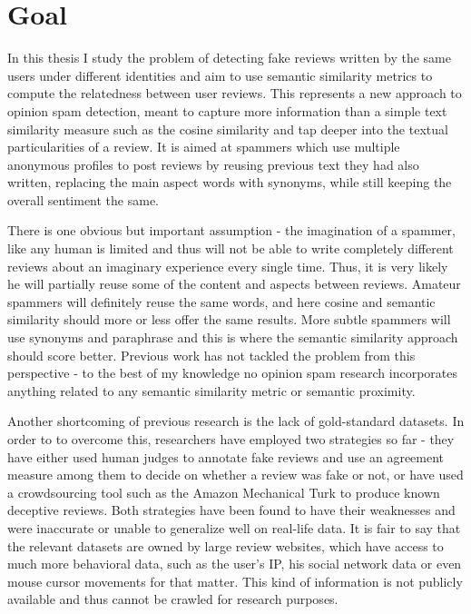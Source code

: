 \chapter{Goal}\label{chapter:goal}

In this thesis I study the problem of detecting fake reviews written by the same users under different identities and aim to use semantic similarity metrics to compute the relatedness between user reviews. This represents a new approach to opinion spam detection, meant to capture more information than a simple text similarity measure such as the cosine similarity and tap deeper into the textual particularities of a review. It is aimed at spammers which use multiple anonymous profiles to post reviews by reusing previous text they had also written, replacing the main aspect words with synonyms, while still keeping the overall sentiment the same. 

There is one obvious but important assumption - the imagination of a spammer, like any human is limited and thus will not be able to write completely different reviews about an imaginary experience every single time. Thus, it is very likely he will partially reuse some of the content and aspects between reviews. Amateur spammers will definitely reuse the same words, and here cosine and semantic similarity should more or less offer the same results. More subtle spammers will use synonyms and paraphrase and this is where the semantic similarity approach should score better. Previous work has not tackled the problem from this perspective - to the best of my knowledge no opinion spam research incorporates anything related to any semantic similarity metric or semantic proximity. 

Another shortcoming of previous research is the lack of gold-standard datasets. In order to to overcome this, researchers have employed two strategies so far - they have either used human judges to annotate fake reviews and use an agreement measure among them to decide on whether a review was fake or not, or have used a crowdsourcing tool such as the Amazon Mechanical Turk to produce known deceptive reviews. Both strategies have been found to have their weaknesses and were inaccurate or unable to generalize well on real-life data. It is fair to say that the relevant datasets are owned by large review websites, which have access to much more behavioral data, such as the user's IP, his social network data or even mouse cursor movements for that matter. This kind of information is not publicly available and thus cannot be crawled for research purposes.

